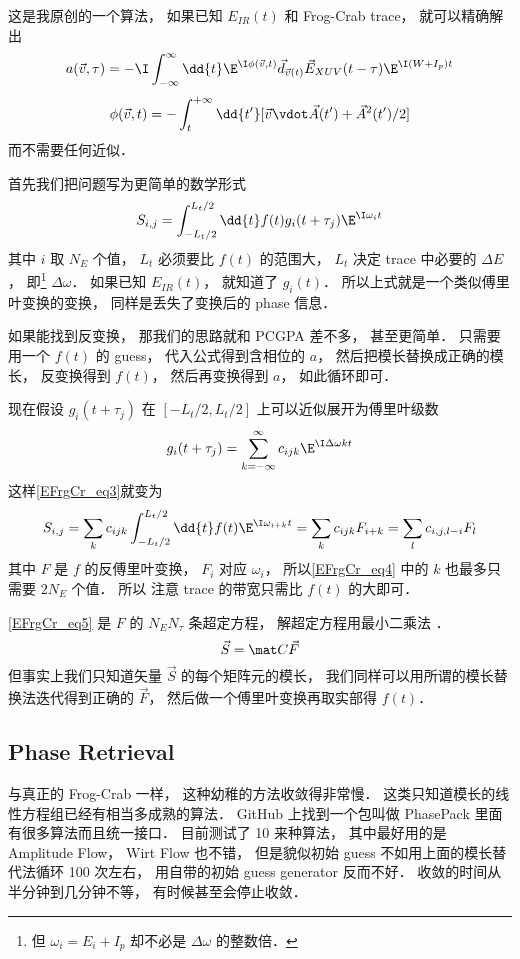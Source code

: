 
这是我原创的一个算法， 如果已知 $E_{IR}(t)$ 和 Frog-Crab trace， 就可以精确解出
\begin{equation}
a(\vec v, \tau) = -\I\int_{-\infty}^{\infty} \dd{t} \E^{\I\phi(\vec v, t)} \vec d_{\vec v(t)} \vec E_{XUV}(t-\tau) \E^{\I(W+I_p)t}
\end{equation}
\begin{equation}
\phi(\vec v, t) = -\int_t^{+\infty} \dd{t'} [\vec v\vdot \vec A(t') + \vec A^2(t')/2]
\end{equation}
而不需要任何近似．

首先我们把问题写为更简单的数学形式
\begin{equation}\label{EFrgCr_eq3}
S_{i, j} = \int_{-L_t/2}^{L_t/2} \dd{t} f(t) g_i(t+\tau_j)\E^{\I\omega_i t}
\end{equation}
其中 $i$ 取 $N_E$ 个值， $L_t$ 必须要比 $f(t)$ 的范围大， $L_t$ 决定 trace 中必要的 $\Delta E$， 即\footnote{但 $\omega_i = E_i + I_p$ 却不必是 $\Delta \omega$ 的整数倍．} $\Delta \omega$． 如果已知 $E_{IR}(t)$， 就知道了 $g_i(t)$． 所以上式就是一个类似傅里叶变换的变换， 同样是丢失了变换后的 phase 信息．

如果能找到反变换， 那我们的思路就和 PCGPA 差不多， 甚至更简单． 只需要用一个 $f(t)$ 的 guess， 代入公式得到含相位的 $a$， 然后把模长替换成正确的模长， 反变换得到 $f(t)$， 然后再变换得到 $a$， 如此循环即可．

现在假设 $g_i(t + \tau_j)$ 在 $[-L_t/2, L_t/2]$ 上可以近似展开为傅里叶级数
\begin{equation}\label{EFrgCr_eq4}
g_i(t + \tau_j) = \sum_{k=-\infty}^{\infty} c_{ijk} \E^{\I \Delta \omega kt}
\end{equation}
这样\autoref{EFrgCr_eq3}就变为
\begin{equation}\label{EFrgCr_eq5}
S_{i, j} = \sum_k c_{ijk} \int_{-L_t/2}^{L_t/2} \dd{t} f(t) \E^{\I \omega_{i+k} t}
= \sum_k c_{ijk} F_{i+k} = \sum_l c_{i,j,l-i} F_l
\end{equation}
其中 $F$ 是 $f$ 的反傅里叶变换， $F_i$ 对应 $\omega_i$， 所以\autoref{EFrgCr_eq4} 中的 $k$ 也最多只需要 $2N_E$ 个值． 所以 注意 trace 的带宽只需比 $f(t)$ 的大即可．

\autoref{EFrgCr_eq5} 是 $F$ 的 $N_E N_\tau$ 条超定方程， 解超定方程用最小二乘法%
．
\begin{equation}
\vec S = \mat C \vec F
\end{equation}
但事实上我们只知道矢量 $\vec S$ 的每个矩阵元的模长， 我们同样可以用所谓的模长替换法迭代得到正确的 $\vec F$， 然后做一个傅里叶变换再取实部得 $f(t)$．

\subsection{Phase Retrieval}
与真正的 Frog-Crab 一样， 这种幼稚的方法收敛得非常慢． 这类只知道模长的线性方程组已经有相当多成熟的算法． GitHub 上找到一个包叫做 PhasePack 里面有很多算法而且统一接口． 目前测试了 10 来种算法， 其中最好用的是 Amplitude Flow， Wirt Flow 也不错， 但是貌似初始 guess 不如用上面的模长替代法循环 100 次左右， 用自带的初始 guess generator 反而不好． 收敛的时间从半分钟到几分钟不等， 有时候甚至会停止收敛．
